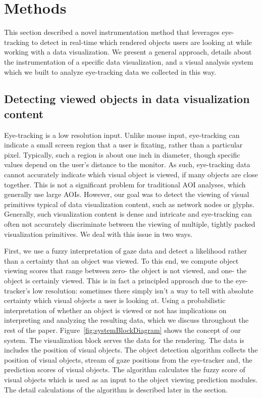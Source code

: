 \section{Methods}\label{sec:Methods}
This section described a novel instrumentation method that leverages eye-tracking to detect in real-time which rendered objects users are looking at while working with a data visualization.  We present a general approach, details about the instrumentation of a specific data visualization, and a visual analysis system which we built to analyze eye-tracking data we collected in this way. 

\subsection{Detecting viewed objects in data visualization content}
Eye-tracking is a low resolution input. Unlike mouse input, eye-tracking can indicate a small screen region that a user is fixating, rather than a particular pixel. Typically, such a region is about one inch in diameter, though specific values depend on the user's distance to the monitor. As such, eye-tracking data cannot accurately indicate which visual object is viewed, if many objects are close together. This is not a significant problem for traditional AOI analyses, which generally use large AOIs. However, our goal was to detect the viewing of visual primitives typical of data visualization content, such as network nodes or glyphs. Generally, such visualization content is dense and intricate and eye-tracking can often not accurately discriminate between the viewing of multiple, tightly packed visualization primitives. We deal with this issue in two ways. 

First, we use a fuzzy interpretation of gaze data and detect a likelihood rather than a certainty that an object was viewed. To this end, we compute object viewing scores that range between zero- the object is not viewed, and one- the object is certainly viewed.  This is in fact a principled approach due to the eye-tracker's low resolution: sometimes there simply isn't a way to tell with absolute certainty which visual objects a user is looking at. Using a probabilistic interpretation of whether an object is viewed or not has implications on interpreting and analyzing the resulting data, which we discuss throughout the rest of the paper. Figure~\ref{fig:systemBlockDiagram} shows the concept of our system. The visualization block serves the data for the rendering. The data is includes the position of visual objects. The object detection algorithm collects the position of visual objects, stream of gaze positions from the eye-tracker and, the prediction scores of visual objects. The algorithm calculates the fuzzy score of visual objects which is used as an input to the object viewing prediction modules. The detail calculations of the algorithm is described later in the section.

